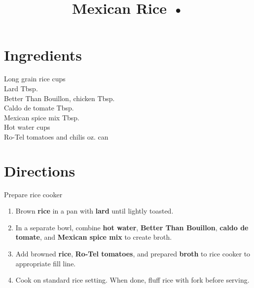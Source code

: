 \documentclass[11pt,letterpaper]{article}
\title{Mexican Rice •}
\author{}
\date{}
\begin{document}
\maketitle
\thispagestyle{empty}

\section*{Ingredients}
\setlength{\columnsep}{20pt}
\begin{multicols}{2}
\noindent
    Long grain rice  cups \\
    Lard  Tbsp. \\
    Better Than Bouillon, chicken  Tbsp. \\
    Caldo de tomate  Tbsp. \\
    Mexican spice mix  Tbsp. \\
    Hot water  cups \\
    Ro-Tel tomatoes and chilis  oz. can
\end{multicols}

\section*{Directions}

\noindent
Prepare rice cooker

\begin{enumerate}
    \item Brown \textbf{rice} in a pan with \textbf{lard} until lightly toasted.
    
    \item In a separate bowl, combine \textbf{hot water}, \textbf{Better Than Bouillon}, \textbf{caldo de tomate}, and \textbf{Mexican spice mix} to create broth.
    
    \item Add browned \textbf{rice}, \textbf{Ro-Tel tomatoes}, and prepared \textbf{broth} to rice cooker to appropriate fill line.
    
    \item Cook on standard rice setting. When done, fluff rice with fork before serving.
\end{enumerate}
\end{document}
